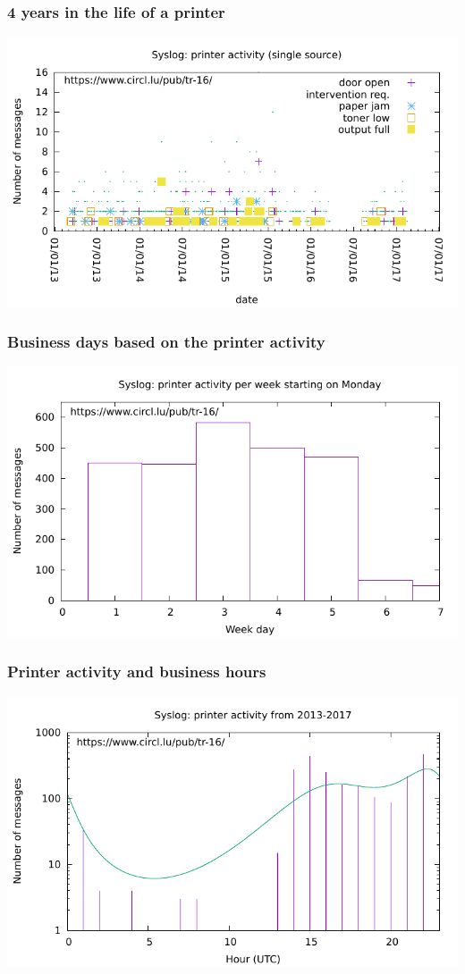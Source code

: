 \documentclass{beamer}
\begin{document}
\begin{frame}
\frametitle{4 years in the life of a printer}
\includegraphics[scale=0.90]{printer.pdf}
\end{frame}

\begin{frame}
\frametitle{Business days based on the printer activity}
\includegraphics[scale=0.90]{printerweek.pdf}
\end{frame}

\begin{frame}
\frametitle{Printer activity and business hours}
\includegraphics[scale=0.90]{printerhours.pdf}
\end{frame}
\end{document}
